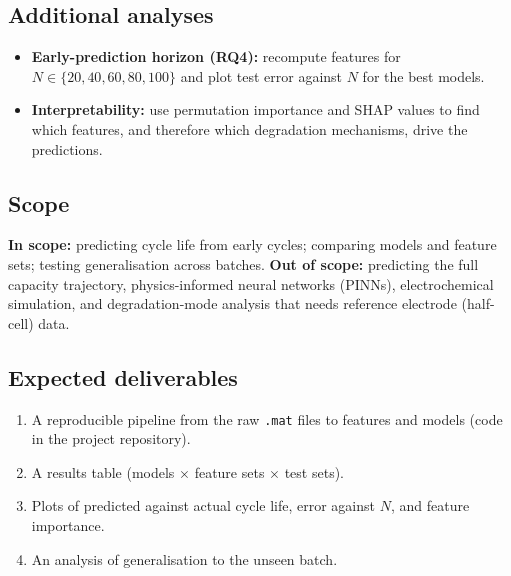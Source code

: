\subsection{Additional analyses}
\begin{itemize}
  \item \textbf{Early-prediction horizon (RQ4):} recompute features for
  $N\in\{20,40,60,80,100\}$ and plot test error against $N$ for the best
  models.
  \item \textbf{Interpretability:} use permutation importance and SHAP values
  to find which features, and therefore which degradation mechanisms,
  drive the predictions.
\end{itemize}

\subsection{Scope}
\textbf{In scope:} predicting cycle life from early cycles; comparing
models and feature sets; testing generalisation across batches.
\textbf{Out of scope:} predicting the full capacity trajectory,
physics-informed neural networks (PINNs), electrochemical simulation, and
degradation-mode analysis that needs reference electrode (half-cell) data.

\subsection{Expected deliverables}
\begin{enumerate}
  \item A reproducible pipeline from the raw \texttt{.mat} files to features
  and models (code in the project repository).
  \item A results table (models $\times$ feature sets $\times$ test sets).
  \item Plots of predicted against actual cycle life, error against $N$,
  and feature importance.
  \item An analysis of generalisation to the unseen batch.
\end{enumerate}
